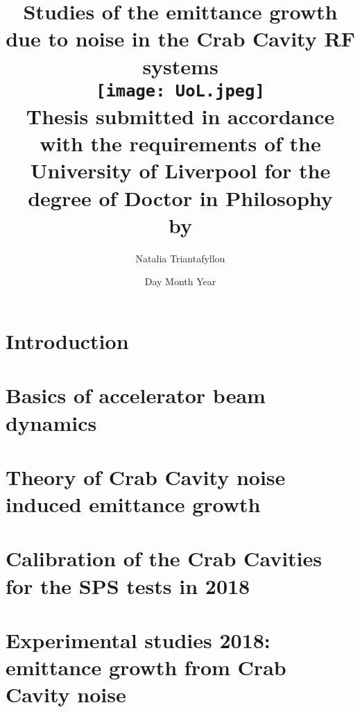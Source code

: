 \documentclass[12pt,twoside]{report} %
\begin{document}
\frontmatter
\title{
{Studies of the emittance growth due to noise in the Crab Cavity RF systems}\\
{\texttt{[image: UoL.jpeg]}} \\
{\large Thesis submitted in accordance with the requirements of the University of Liverpool for the degree of Doctor in Philosophy \\ by}
}
\author{ Natalia Triantafyllou}
\date{Day Month Year}
\maketitle
\newpage




\listoffigures
{}
\listoftables
{}

\newpage

\thispagestyle{plain} %

\listofsymbols
{}

\tableofcontents

\mainmatter

\chapter{Introduction}


\chapter{Basics of accelerator beam dynamics}


\chapter{Theory of Crab Cavity noise induced emittance growth}\label{Ch:CC_noise_theory}


\chapter{Calibration of the Crab Cavities for the SPS tests in 2018}\label{Ch:CC_set_up}


\chapter{Experimental studies 2018: emittance growth from Crab Cavity noise}\label{Ch:2018_analyisis}

\end{document}
